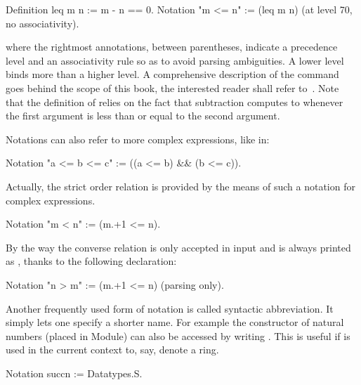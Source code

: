 \begin{coq}{}{}
Definition leq m n := m - n == 0.
Notation "m <= n" := (leq m n) (at level 70, no associativity).
\end{coq}

where the rightmost annotations, between parentheses, indicate a
precedence level and an associativity rule so as to avoid parsing
ambiguities. A lower level binds more than a higher level. A comprehensive
description of the  command goes behind the scope of this
book, the interested reader shall refer to~\cite[Chapter 12]{Coq:manual}.
Note that the definition of  relies on the fact that
subtraction computes to  whenever the first argument is less than
or equal to the second argument.


Notations can also refer to more complex expressions, like in:

\begin{coq}{}{}
Notation "a <= b <= c" := ((a <= b) && (b <= c)).
\end{coq}

Actually, the strict order relation is provided by the means of such a
notation for complex expressions.

\begin{coq}{}{}
Notation "m < n"  := (m.+1 <= n).
\end{coq}


By the way the converse relation  is only accepted in input
and is always printed as  , thanks to the following declaration:

\begin{coq}{}{}
Notation "n > m"  := (m.+1 <= n) (parsing only).
\end{coq}

Another frequently used form of notation is called syntactic abbreviation.
It simply lets one specify a shorter name.  For example the  constructor
of natural numbers (placed in  Module) can also be accessed
by writing .  This is useful if  is used in the current context
to, say, denote a ring.

\begin{coq}{}{}
Notation succn := Datatypes.S.
\end{coq}

